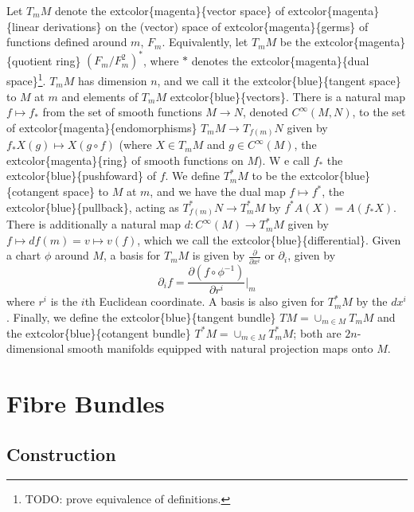 \documentclass[
]{book}
\begin{document}
Let \(T_m M\) denote the extcolor\{magenta\}\{vector space\} of extcolor\{magenta\}\{linear derivations\} on the (vector) space of extcolor\{magenta\}\{germs\} of functions defined around \(m\), \(F_m\).
Equivalently, let \(T_m M\) be the extcolor\{magenta\}\{quotient ring\} \((F_m/F_m^2)^*\), where \(*\) denotes the extcolor\{magenta\}\{dual space\}\footnote{TODO: prove equivalence of definitions.}.
\(T_m M\) has dimension \(n\), and we call it the extcolor\{blue\}\{tangent space\} to \(M\) at \(m\) and elements of \(T_m M\) extcolor\{blue\}\{vectors\}.
There is a natural map \(f \mapsto f_*\) from the set of smooth functions \(M \to N\), denoted \(C^\infty(M,N)\), to the set of extcolor\{magenta\}\{endomorphisms\} \(T_m M \to T_{f(m)} N\) given by \(f_* X(g) \mapsto X(g \circ f)\) (where \(X \in T_m M\) and \(g \in C^\infty(M)\), the extcolor\{magenta\}\{ring\} of smooth functions on \(M\)). W
e call \(f_*\) the extcolor\{blue\}\{pushfoward\} of \(f\).
We define \(T_m^* M\) to be the extcolor\{blue\}\{cotangent space\} to \(M\) at \(m\), and we have the dual map \(f \mapsto f^*\), the extcolor\{blue\}\{pullback\}, acting as \(T_{f(m)}^* N \to T_m^* M\) by \(f^* A(X) = A(f_* X)\).
There is additionally a natural map \(d : C^\infty(M) \to T_m^* M\) given by \(f \mapsto df(m) = v \mapsto v(f)\), which we call the extcolor\{blue\}\{differential\}.
Given a chart \(\phi\) around \(M\), a basis for \(T_m M\) is given by \(\frac{\partial}{\partial x^i}\) or \(\partial_{i}\), given by
\begin{equation}     
    \partial_{i}f = \frac{\partial (f \circ \phi^{-1})}{\partial r^i}\Big|_m 
\end{equation}
where \(r^i\) is the \(i\)th Euclidean coordinate.
A basis is also given for \(T^*_m M\) by the \(dx^i\).
Finally, we define the extcolor\{blue\}\{tangent bundle\} \(TM = \cup_{m\in M} T_m M\) and the extcolor\{blue\}\{cotangent bundle\} \(T^*M = \cup_{m\in M} T_m^* M\); both are \(2n\)-dimensional smooth manifolds equipped with natural projection maps onto \(M\).

\hypertarget{fibre-bundles}{%
\chapter{Fibre Bundles}\label{fibre-bundles}}

\hypertarget{construction-1}{%
\section{Construction}\label{construction-1}}
\end{document}
